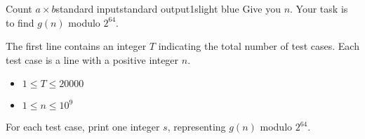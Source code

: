 \begin{problem}{Count $a\times b$}{standard input}{standard output}{1s}{light blue}
Give you $n$. Your task is to find $g(n)$ modulo $2^{64}$. 

\InputFile
The first line contains an integer $T$ indicating the total number of test cases.
Each test case is a line with a positive integer $n$.

\begin{itemize}
\item $1 \le T \le 20000$
\item $1 \le n \le 10^9$
\end{itemize}

\OutputFile
For each test case, print one integer $s$, representing $g(n)$ modulo $2^{64}$. 

\Example

\begin{example}
%
\end{example}

\end{problem}